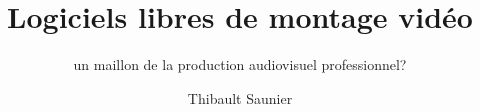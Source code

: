 \documentclass[a4paper,12pt]{book}
\begin{document}
\title{Logiciels libres de montage vidéo}
\subtitle{un maillon de la production audiovisuel professionnel?}
\author{Thibault Saunier}
\withdate
\subject{Les logiciels de montage vidéos libre en milieu professionnel}
\maketitle





\dominitoc
\setcounter{secnumdepth}{3}
\setcounter{minitocdepth}{3}
\setcounter{tocdepth}{1}
\tableofcontents{}

\thispagestyle{empty}






\newpage
\pagestyle{empty}
\setcounter{tocdepth}{3}



\newpage
\printindex
\listoffigures

\newpage
\printglossary

\newpage



\end{document}
